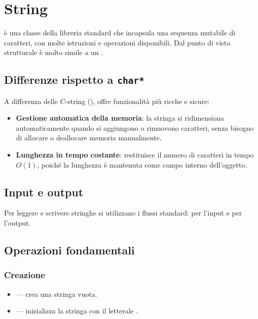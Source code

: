 \section{String}
 \`e una classe della libreria standard che incapsula
una sequenza mutabile di caratteri, con molte istruzioni e operazioni disponibili.
Dal punto di vista strutturale \`e molto simile a un .

\subsection{Differenze rispetto a \texttt{char*}}

A differenza delle C-string (), 
offre funzionalit\`a pi\`u ricche e sicure:

\begin{itemize}
    \item \textbf{Gestione automatica della memoria}: la stringa si ridimensiona
          automaticamente quando si aggiungono o rimuovono caratteri,
          senza bisogno di allocare o deallocare memoria manualmente.

    \item \textbf{Lunghezza in tempo costante}: 
          restituisce il numero di caratteri in tempo $O(1)$, poich\'e
          la lunghezza \`e mantenuta come campo interno dell'oggetto.
\end{itemize}

\subsection{Input e output}

Per leggere e scrivere stringhe si utilizzano i flussi standard:
 per l'input e  per l'output.

\subsection{Operazioni fondamentali}

\subsubsection{Creazione}

\begin{itemize}
    \item {} --- crea una stringa vuota.
    \item {} --- inizializza la stringa con il letterale .
\end{itemize}

